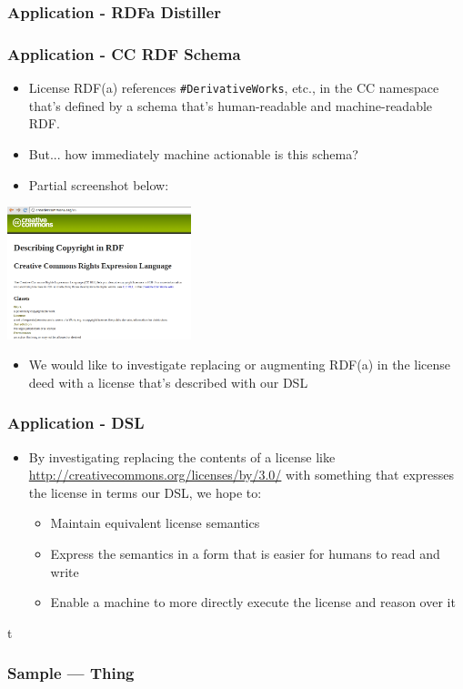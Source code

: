 \documentclass[t, xcolor=dvipsnames, 10pt]{beamer}
\begin{document}
\begin{frame}[fragile]
\frametitle{Application - RDFa Distiller}

\end{frame}

\begin{frame}[t]
\frametitle{Application - CC RDF Schema}
        \begin{itemize}
            \item License RDF(a) references \texttt{\#DerivativeWorks}, etc.,
            in the CC namespace that's defined by a schema that's
            human-readable and machine-readable RDF.
            \item But... how immediately machine actionable is this schema?
            \item Partial screenshot below:
        \end{itemize}
        \begin{center}
            \includegraphics[width=0.4\textwidth]{resources/cc/schema-screenshot-partial.png}
        \end{center}
        \begin{itemize}
            \item We would like to investigate replacing or augmenting RDF(a)
            in the license deed with a license that's described with our DSL
        \end{itemize}
\end{frame}

\begin{frame}[t]
\frametitle{Application - DSL}
    \begin{itemize}
        \item By investigating replacing the contents of a license like
        \url{http://creativecommons.org/licenses/by/3.0/} with something that
        expresses the license in terms our DSL, we hope to:
        \begin{itemize}
            \item Maintain equivalent license semantics
            \item Express the semantics in a form that is easier for humans to read and write
            \item Enable a machine to more directly execute the license and reason over it
        \end{itemize}
    \end{itemize}
\end{frame}





\begin{frame}{t}
\frametitle{Sample --- Thing}
\begin{columns}[t]
\end{columns}
\end{frame}
\end{document}
